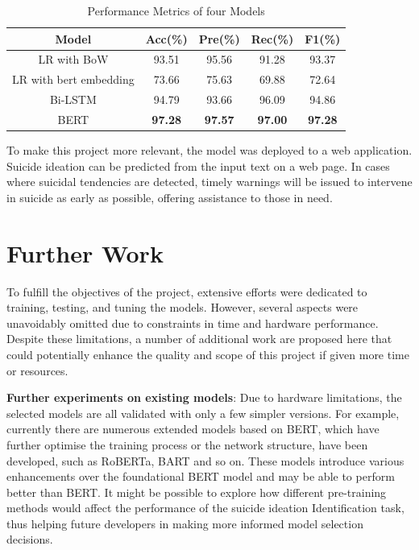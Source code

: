 \documentclass[ %
                    author={Bocheng Wang},
                supervisor={Dr. Qiang Liu},
                    degree={MSc},
                     title={A Research on Identification of Suicide Ideation in Texts with Multiple Models},
                      type={},
                      year={2024}]{dissertation}
\begin{document}
\begin{table}[!h]
      \centering
      \begin{tabular}{c|cccc}
            \hline
            Model & Acc(\%) & Pre(\%) & Rec(\%) & F1(\%) \\
            \hline
            LR with BoW             & 93.51 & 95.56 & 91.28 & 93.37 \\
            LR with bert embedding  & 73.66 & 75.63 & 69.88 & 72.64 \\
            Bi-LSTM                 & 94.79 & 93.66 & 96.09 & 94.86 \\
            BERT                    & \textbf{97.28} & \textbf{97.57} & \textbf{97.00} & \textbf{97.28} \\
            \hline
      \end{tabular}
      \caption{Performance Metrics of four Models}
      \label{tab:performancemetrics}
\end{table}

To make this project more relevant, the model was deployed to a web application. Suicide ideation can be predicted from the input text on a web page. In cases where suicidal tendencies are detected, timely warnings will be issued to intervene in suicide as early as possible, offering assistance to those in need.

\section{Further Work}
\noindent
To fulfill the objectives of the project, extensive efforts were dedicated to training, testing, and tuning the models. However, several aspects were unavoidably omitted due to constraints in time and hardware performance. Despite these limitations, a number of additional work are proposed here that could potentially enhance the quality and scope of this project if given more time or resources.

\textbf{Further experiments on existing models}: Due to hardware limitations, the selected models are all validated with only a few simpler versions. For example, currently there are numerous extended models based on BERT, which have further optimise the training process or the network structure, have been developed, such as RoBERTa, BART and so on. These models introduce various enhancements over the foundational BERT model and may be able to perform better than BERT. It might be possible to explore how different pre-training methods would affect the performance of the suicide ideation Identification task, thus helping future developers in making more informed model selection decisions.
\end{document}
